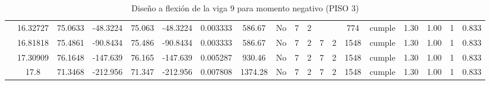 \begin{table}[H]
{\begin{tabular}{|c|c|c|c|c|c|r|c|c|c|c|c|c|c|c|c|c|c|c|}
\cline{2-19}        & 16.32727 & 75.0633 & -48.3224 & 75.063 & -48.3224 & 0.003333 & 586.67 & No  & 7   & 2   &     &     & 774 & \cellcolor[rgb]{ .776,  .937,  .808}cumple & 1.30 & 1.00 & 1   & 0.833 \bigstrut\\
\cline{2-19}        & 16.81818 & 75.4861 & -90.8434 & 75.486 & -90.8434 & 0.003333 & 586.67 & No  & 7   & 2   & 7   & 2   & 1548 & \cellcolor[rgb]{ .776,  .937,  .808}cumple & 1.30 & 1.00 & 1   & 0.833 \bigstrut\\
\cline{2-19}        & 17.30909 & 76.1648 & -147.639 & 76.165 & -147.639 & 0.005287 & 930.46 & No  & 7   & 2   & 7   & 2   & 1548 & \cellcolor[rgb]{ .776,  .937,  .808}cumple & 1.30 & 1.00 & 1   & 0.833 \bigstrut\\
\cline{2-19}        & 17.8 & 71.3468 & -212.956 & 71.347 & -212.956 & 0.007808 & 1374.28 & No  & 7   & 2   & 7   & 2   & 1548 & \cellcolor[rgb]{ .776,  .937,  .808}cumple & 1.30 & 1.00 & 1   & 0.833 \bigstrut\\
    \hline
    \end{tabular}%
 
  }
      \caption{Diseño a flexión de la viga 9 para momento negativo (PISO 3) }
  \label{tab:F VG9 P2 M-}%
\end{table}%
